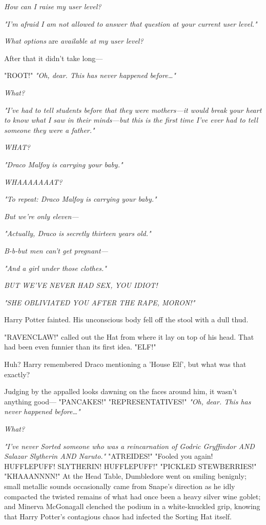 \emph{How can I raise my user level?}

\emph{"I'm afraid I am not allowed to answer that question at your current user 
level."}

\emph{What options} are\emph{ available at my user level?}

After that it didn't take long---

"ROOT!"
\sbreak
\emph{"Oh, dear. This has never happened before{\ldots}"}

\emph{What?}

\emph{"I've had to tell students before that they were mothers---it would break 
your heart to know what I saw in their minds---but this is the first time I've 
ever had to tell someone they were a father."}

\emph{WHAT?}

\emph{"Draco Malfoy is carrying your baby."}

\emph{WHAAAAAAAT?}

\emph{"To repeat: Draco Malfoy is carrying your baby."}

\emph{But we're only eleven---}

\emph{"Actually, Draco is secretly thirteen years old."}

\emph{B-b-but men can't get pregnant---}

\emph{"And a girl under those clothes."}

\emph{BUT WE'VE NEVER HAD SEX, YOU IDIOT!}

\emph{"SHE OBLIVIATED YOU AFTER THE RAPE, MORON!"}

Harry Potter fainted. His unconscious body fell off the stool with a dull thud.

"RAVENCLAW!" called out the Hat from where it lay on top of his head. That had 
been even funnier than its first idea.
\sbreak
"ELF!"

Huh? Harry remembered Draco mentioning a 'House Elf', but what was that exactly?

Judging by the appalled looks dawning on the faces around him, it wasn't 
anything good---
\sbreak
"PANCAKES!"
\sbreak
"REPRESENTATIVES!"
\sbreak
\emph{"Oh, dear. This has never happened before{\ldots}"}

\emph{What?}

\emph{"I've never Sorted someone who was a reincarnation of Godric Gryffindor 
AND Salazar Slytherin AND Naruto."}
\sbreak
"ATREIDES!"
\sbreak
"Fooled you again! HUFFLEPUFF! SLYTHERIN! HUFFLEPUFF!"
\sbreak
"PICKLED STEWBERRIES!"
\sbreak
"KHAAANNNN!"
\sbreak
At the Head Table, Dumbledore went on smiling benignly; small metallic sounds 
occasionally came from Snape's direction as he idly compacted the twisted 
remains of what had once been a heavy silver wine goblet; and Minerva 
McGonagall clenched the podium in a white-knuckled grip, knowing that Harry 
Potter's contagious chaos had infected the Sorting Hat itself.

